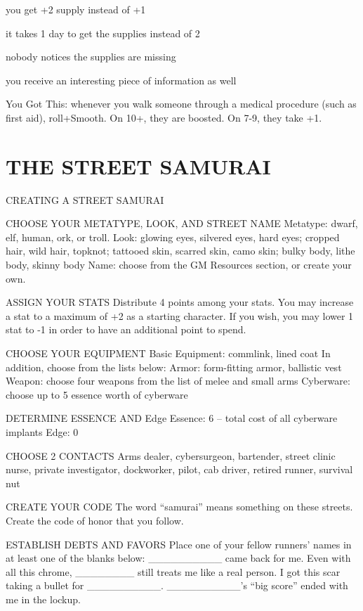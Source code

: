 you get +2 supply instead of +1

it takes 1 day to get the supplies instead of 2

nobody notices the supplies are missing

you receive an interesting piece of information as well

You Got This: whenever you walk someone through a medical procedure (such as first aid), roll+Smooth. On 10+, they are boosted. On 7-9, they take +1.



\clearpage
\section{THE STREET SAMURAI}
CREATING A STREET SAMURAI

CHOOSE YOUR METATYPE, LOOK, AND STREET NAME
Metatype: dwarf, elf, human, ork, or troll.
Look: glowing eyes, silvered eyes, hard eyes; cropped hair, wild hair, topknot; tattooed skin, scarred skin, camo skin; bulky body, lithe body, skinny body
Name: choose from the GM Resources section, or create your own.

ASSIGN YOUR STATS
Distribute 4 points among your stats. You may increase a stat to a maximum of +2 as a starting character. If you wish, you may lower 1 stat to -1 in order to have an additional point to spend.

CHOOSE YOUR EQUIPMENT
Basic Equipment: commlink, lined coat
In addition, choose from the lists below:
Armor: form-fitting armor, ballistic vest
Weapon: choose four weapons from the list of melee and small arms
Cyberware: choose up to 5 essence worth of cyberware

DETERMINE ESSENCE AND Edge
Essence: 6 – total cost of all cyberware implants
Edge: 0

CHOOSE 2 CONTACTS
Arms dealer, cybersurgeon, bartender, street clinic nurse, private investigator, dockworker, pilot, cab driver, retired runner, survival nut

CREATE YOUR CODE
The word “samurai” means something on these streets. Create the code of honor that you follow.

ESTABLISH DEBTS AND FAVORS
Place one of your fellow runners’ names in at least one of the blanks below:
\_\_\_\_\_\_\_\_\_\_ came back for me.
Even with all this chrome, \_\_\_\_\_\_\_\_ still treats me like a real person.
I got this scar taking a bullet for \_\_\_\_\_\_\_\_\_\_.
\_\_\_\_\_\_\_\_\_\_’s “big score” ended with me in the lockup.

